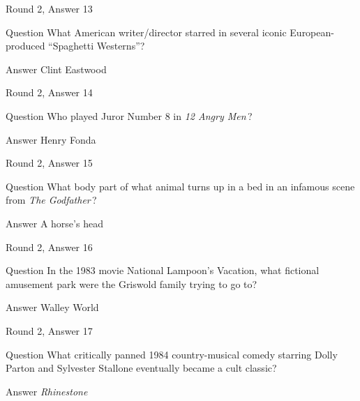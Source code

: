 \documentclass[11pt]{beamer}
\begin{document}
\begin{frame}[t]{Round 2, Answer 13}
\vspace{2em}
\begin{block}{Question}
What American writer/director starred in several iconic European-produced ``Spaghetti Westerns''?
\end{block}
\pause{}
\begin{block}{Answer}
Clint Eastwood
\end{block}
\end{frame}
    

\begin{frame}[t]{Round 2, Answer 14}
\vspace{2em}
\begin{block}{Question}
Who played Juror Number 8 in \emph{12 Angry Men}\,?
\end{block}
\pause{}
\begin{block}{Answer}
Henry Fonda
\end{block}
\end{frame}
    

\begin{frame}[t]{Round 2, Answer 15}
\vspace{2em}
\begin{block}{Question}
What body part of what animal turns up in a bed in an infamous scene from \emph{The Godfather}\,?
\end{block}
\pause{}
\begin{block}{Answer}
A horse's head
\end{block}
\end{frame}
    

\begin{frame}[t]{Round 2, Answer 16}
\vspace{2em}
\begin{block}{Question}
In the 1983 movie National Lampoon's Vacation, what fictional amusement park were the Griswold family trying to go to?
\end{block}
\pause{}
\begin{block}{Answer}
Walley World
\end{block}
\end{frame}
    

\begin{frame}[t]{Round 2, Answer 17}
\vspace{2em}
\begin{block}{Question}
What critically panned 1984 country-musical comedy starring Dolly Parton and Sylvester Stallone eventually became a cult classic?
\end{block}
\pause{}
\begin{block}{Answer}
\emph{Rhinestone}
\end{block}
\end{frame}
    
\end{document}
